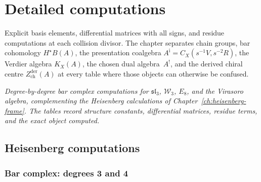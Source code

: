 \chapter{Detailed computations}
\label{chap:detailed-computations}

Explicit basis elements, differential matrices with all signs, and
residue computations at each collision divisor. The chapter separates
chain groups, bar cohomology $H^\star B(A)$, the presentation
coalgebra $A^{\mathrm i}=C_X(s^{-1}V,s^{-2}R)$, the Verdier algebra
$K_X(A)$, the chosen dual algebra~$A^!$, and the derived chiral centre
$Z^{\mathrm{der}}_{\mathrm{ch}}(A)$ at every table where those objects
can otherwise be confused.

\noindent\emph{Degree-by-degree bar complex computations for $\mathfrak{sl}_3$, $\mathcal{W}_3$, $E_8$, and the Virasoro algebra, complementing the Heisenberg calculations of Chapter~\ref{ch:heisenberg-frame}. The tables record structure constants, differential matrices, residue terms, and the exact object computed.}

\section{Heisenberg computations}

\subsection{Bar complex: degrees 3 and 4}

